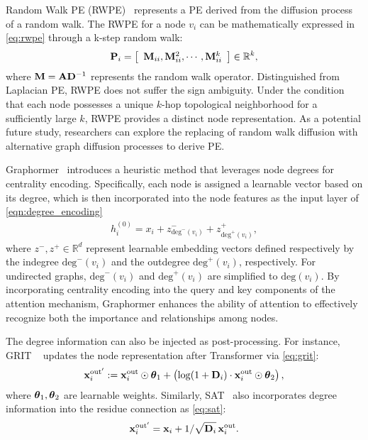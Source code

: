 Random Walk PE (RWPE)~\cite{dwivedi2022graph} represents a PE derived from the diffusion process of a random walk. The RWPE for a node $v_i$ can be mathematically expressed in \cref{eq:rwpe} through a k-step random walk:
\begin{align}
\mathbf{P}_i = \left[ \begin{array}{c} \mathbf{M}_{ii}, \mathbf{M}_{ii}^2, \cdots, \mathbf{M}_{ii}^k \end{array} \right]\in\mathbb{R}^{k}, \label{eq:rwpe} 
\end{align}
where $\mathbf{M} = \mathbf{A}\mathbf{D}^{-1}$ represents the random walk operator. Distinguished from Laplacian PE, RWPE does not suffer the sign ambiguity. Under the condition that each node possesses a unique $k$-hop topological neighborhood for a sufficiently large $k$, RWPE provides a distinct node representation. As a potential future study, researchers can explore the replacing of random walk diffusion with alternative graph diffusion processes to derive PE.

Graphormer~\cite{Graphormer} introduces a heuristic method that leverages node degrees for centrality encoding. Specifically, each node is assigned a learnable vector based on its degree, which is then incorporated into the node features as the input layer of \cref{eqn:degree_encoding}
\begin{align}
\label{eqn:degree_encoding}
    h_i^{(0)} = x_i + z^-_{\text{deg}^{-}(v_i)} + z^+_{\text{deg}^{+}(v_i)},
\end{align}
where $z^{-}, z^{+} \in \mathbb{R}^d$ represent learnable embedding vectors defined respectively by the indegree $\text{deg}^{-}(v_i)$ and the outdegree $\text{deg}^{+}(v_i)$, respectively. For undirected graphs, $\text{deg}^{-}(v_i)$ and $\text{deg}^{+}(v_i)$ are  simplified to $\text{deg}(v_i)$. By incorporating centrality encoding into the query and key components of the attention mechanism, Graphormer enhances the ability of attention to effectively recognize both the importance and relationships among nodes.

The degree information can also be injected as post-processing. For instance, GRIT ~\cite{ma2023graph} updates the node representation after Transformer via \cref{eq:grit}:
   \begin{align}
   \label{eq:grit}
    \mathbf{x}^{\text{out}'}_i :=  \mathbf{x}^\text{out}_i \odot \boldsymbol{\theta}_1 + \left( \log(1 + \mathbf{D}_i) \cdot \mathbf{x}^\text{out}_i \odot \boldsymbol{\theta}_2 \right) , 
   \end{align}
where $\boldsymbol{\theta}_1, \boldsymbol{\theta}_2$ are learnable weights.
Similarly, SAT~\cite{chen2022structure} also incorporates degree information into the residue connection as \cref{eq:sat}:
\begin{align}
\label{eq:sat}
\mathbf{x}^{\text{out}'}_i=\mathbf{x}_{i}+1/\sqrt{\mathbf{D}_i} \,\mathbf{x}^{\text{out}}_i.
\end{align}

